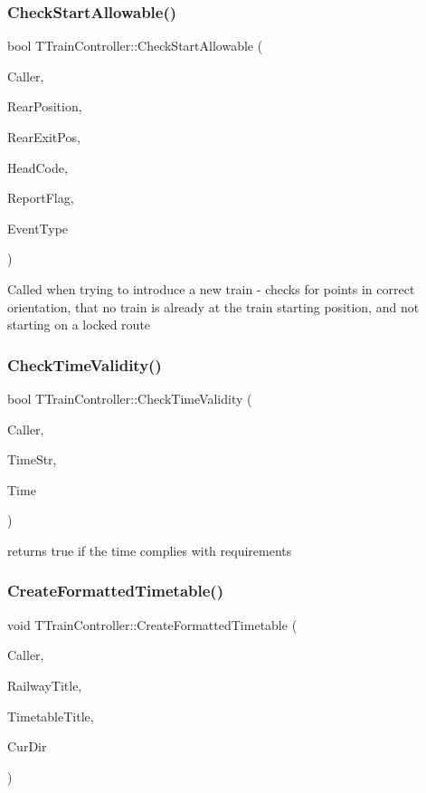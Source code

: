 \subsubsection{\texorpdfstring{Check\+Start\+Allowable()}{CheckStartAllowable()}}
{\footnotesize\ttfamily bool T\+Train\+Controller\+::\+Check\+Start\+Allowable (\begin{DoxyParamCaption}\item[{int}]{Caller,  }\item[{int}]{Rear\+Position,  }\item[{int}]{Rear\+Exit\+Pos,  }\item[{Ansi\+String}]{Head\+Code,  }\item[{bool}]{Report\+Flag,  }\item[{T\+Action\+Event\+Type \&}]{Event\+Type }\end{DoxyParamCaption})}

Called when trying to introduce a new train -\/ checks for points in correct orientation, that no train is already at the train starting position, and not starting on a locked route \mbox{\label{class_t_train_controller_a523077cf0c9c02c8cb56dab0af9b0e52}} 
\subsubsection{\texorpdfstring{Check\+Time\+Validity()}{CheckTimeValidity()}}
{\footnotesize\ttfamily bool T\+Train\+Controller\+::\+Check\+Time\+Validity (\begin{DoxyParamCaption}\item[{int}]{Caller,  }\item[{Ansi\+String}]{Time\+Str,  }\item[{T\+Date\+Time \&}]{Time }\end{DoxyParamCaption})}

returns true if the time complies with requirements \mbox{\label{class_t_train_controller_a4ab4b6a568064d27c65f0770e5a5ccd0}} 
\subsubsection{\texorpdfstring{Create\+Formatted\+Timetable()}{CreateFormattedTimetable()}}
{\footnotesize\ttfamily void T\+Train\+Controller\+::\+Create\+Formatted\+Timetable (\begin{DoxyParamCaption}\item[{int}]{Caller,  }\item[{Ansi\+String}]{Railway\+Title,  }\item[{Ansi\+String}]{Timetable\+Title,  }\item[{Ansi\+String}]{Cur\+Dir }\end{DoxyParamCaption})}

